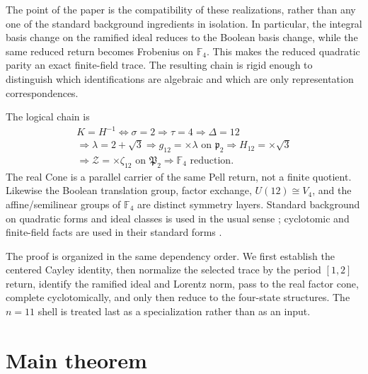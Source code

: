 \documentclass[11pt]{article}
\theoremstyle{remark}
\newcommand{\F}{\mathbb F}
\begin{document}
The point of the paper is the compatibility of these realizations, rather than
any one of the standard background ingredients in isolation.  In particular,
the integral basis change on the ramified ideal reduces to the Boolean basis
change, while the same reduced return becomes Frobenius on $\F_4$.  This makes
the reduced quadratic parity an exact finite-field trace.  The resulting chain
is rigid enough to distinguish which identifications are algebraic and which
are only representation correspondences.

The logical chain is
\[
\boxed{
\begin{gathered}
K=H^{-1}\Longleftrightarrow\sigma=2
\Longrightarrow\tau=4\Longrightarrow\Delta=12\\
\Longrightarrow\lambda=2+\sqrt3
\Longrightarrow g_{12}=\times\lambda\text{ on }\mathfrak p_2
\Longrightarrow H_{12}=\times\sqrt3\\
\Longrightarrow \mathcal Z=\times\zeta_{12}\text{ on }\mathfrak P_2
\Longrightarrow \F_4\text{ reduction}.
\end{gathered}}
\]
The real Cone is a parallel carrier of the same Pell return, not a finite
quotient.  Likewise the Boolean translation group, factor exchange,
$U(12)\cong V_4$, and the affine/semilinear groups of $\F_4$ are distinct
symmetry layers.  Standard background on quadratic forms and ideal classes is
used in the usual sense \cite{Cox,Neukirch}; cyclotomic and finite-field facts
are used in their standard forms \cite{Washington,LidlNiederreiter}.

The proof is organized in the same dependency order.  We first establish the
centered Cayley identity, then normalize the selected trace by the period
$[1,2]$ return, identify the ramified ideal and Lorentz norm, pass to the real
factor cone, complete cyclotomically, and only then reduce to the four-state
structures.  The $n=11$ shell is treated last as a specialization rather than
as an input.

\section{Main theorem}
\end{document}
